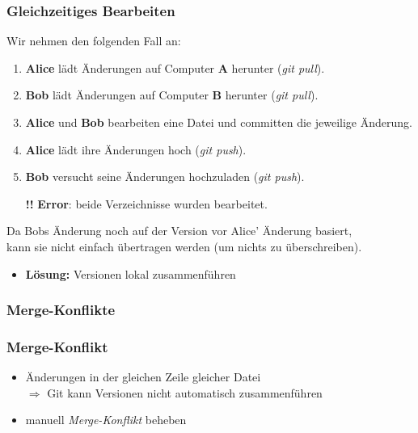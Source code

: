 \documentclass[
	ngerman, %
	aspectratio=169, %
	color={accentcolor=8b},
	colorframetitle=true,%
	authorontitle=true
]{tudabeamer}
\begin{document}
			\begin{frame}
				\frametitle{Gleichzeitiges Bearbeiten}
				Wir nehmen den folgenden Fall an:
				\begin{enumerate}
					\item \textbf{Alice} lädt Änderungen auf Computer \textbf{A} herunter (\textit{git pull}).
					\pause
					\item \textbf{Bob} lädt Änderungen auf Computer \textbf{B} herunter (\textit{git pull}).
					\pause
					\item \textbf{Alice} und \textbf{Bob} bearbeiten eine Datei und committen die jeweilige Änderung.
					\pause
					\item \textbf{Alice} lädt ihre Änderungen hoch (\textit{git push}).
					\pause
					\item \textbf{Bob} versucht seine Änderungen hochzuladen (\textit{git push}).
					\pause
					\item [\textbf{!!}] \textbf{Error}: beide Verzeichnisse wurden bearbeitet.
				\end{enumerate}
				
				Da Bobs Änderung noch auf der Version vor Alice' Änderung basiert,\\
				kann sie nicht einfach übertragen werden (um nichts zu überschreiben).\\
				\begin{itemize}
					\item \textbf{Lösung:} Versionen lokal zusammenführen
				\end{itemize}
			\end{frame}
			
		\subsubsection{Merge-Konflikte}
			\begin{frame}
				\frametitle{Merge-Konflikt}
					\begin{itemize}
						\item Änderungen in der gleichen Zeile gleicher Datei\\
						$\Rightarrow$ Git kann Versionen nicht automatisch zusammenführen
						\item manuell \textit{Merge-Konflikt} beheben
					\end{itemize}
			\end{frame}
			
\end{document}
